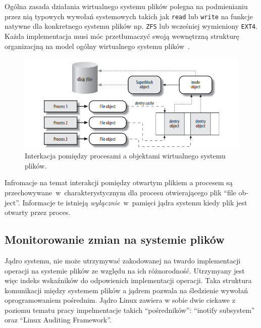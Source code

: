 Ogólna zasada działania wirtualnego systemu plików polegna na podmienianiu przez nią typowych wywołań systemowych
takich jak \texttt{read} lub \texttt{write} na funkcje natywne dla konkretnego systemu plików np. \texttt{ZFS} lub wcześniej wymieniony \texttt{EXT4}.
Każda implementacja musi móc przetłumaczyć swoją wewnętrzną strukturę organizacjną na model ogólny wirtualnego systemu plików~\cite{kernel}.
\begin{figure}[H]
    \centering
    \includegraphics[width=0.9\linewidth]{rysunki/interakcjavfs.png}
    \caption{Interkacja pomiędzy procesami a objektami wirtualnego systemu plików\protect \footnotemark.} 
    \label{fig:enter-label}
\end{figure}

Infromacje na temat interakcji pomiędzy otwartym plikiem a procesem są przechowywane~w~charakterystycznym dla procesu otwierającego plik \foreignquote{english}{file object}.
Informacje te istnieją \emph{wyłącznie}~w~pamięci jądra systemu kiedy plik jest otwarty przez proces. 
\subsection{Monitorowanie zmian na systemie plików}
\label{sec:monitorowanie}
Jądro systemu, nie może utrzymywać zakodowanej na twardo implementacji operacji na systemie plików ze względu
na ich różnorodność. Utrzymyany jest więc indeks wskaźników do odpowienich implementacji operacji. Taka struktura komunikacji
między systemem plików a jądrem pozwala na śledzienie wywołań oprogramowaniem pośrednim. Jądro Linux zawiera w sobie dwie ciekawe
z poziomu tematu pracy impelmentacje takich \enquote{pośredników}: \foreignquote{english}{inotify subsystem} oraz \foreignquote{english}{Linux Auditing Framework}.
